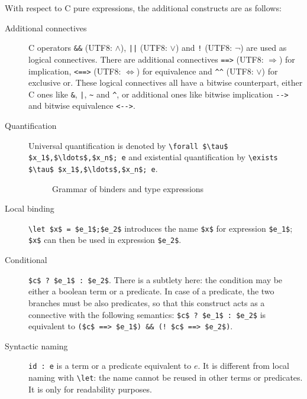 With respect to C pure expressions, the additional constructs are as follows:
\begin{description}
\item[Additional connectives] C operators \lstinline|&&| (UTF8:
  $\land$), \lstinline+||+ (UTF8: $\lor$) and \lstinline|!| (UTF8:
  $\neg$) are used as logical connectives. There are additional
  connectives \lstinline|==>| (UTF8: $\Longrightarrow$) for
  implication, \lstinline|<==>| (UTF8: $\Longleftrightarrow$) for
  equivalence and \lstinline|^^| (UTF8: \underline{\ensuremath{\lor}})
  for exclusive
  or. These logical connectives all have a bitwise counterpart, either
  C ones like \lstinline|&|, \lstinline+|+, \lstinline|~| and
  \lstinline|^|, or additional ones like bitwise implication
  \lstinline|-->| and bitwise equivalence \lstinline|<-->|.

\item[Quantification] Universal quantification is denoted by
  \lstinline|\forall $\tau$ $x_1$,$\ldots$,$x_n$; e| and existential
  quantification by \lstinline|\exists $\tau$ $x_1$,$\ldots$,$x_n$; e|.

\begin{figure}[htp]
  \begin{cadre} 
    \end{cadre}
  \caption{Grammar of binders and type expressions}
\label{fig:gram:binders}
\end{figure}

\item[Local binding]
    \lstinline|\let $x$ = $e_1$;$e_2$|
    introduces the name \lstinline|$x$| for
    expression \lstinline|$e_1$|; \lstinline|$x$| can then be used in expression
    \lstinline|$e_2$|.

\item[Conditional] \lstinline|$c$ ? $e_1$ : $e_2$|. There is a subtlety
  here: the condition may be either a boolean term or a predicate.  In
  case of a predicate, the two branches must be also predicates, so
  that this construct acts as a connective with the following
  semantics: \lstinline|$c$ ? $e_1$ : $e_2$| is equivalent to
  \lstinline|($c$ ==> $e_1$) && (! $c$ ==> $e_2$)|.

\item[Syntactic naming] \lstinline|id : e| is a term or a predicate
  equivalent to $e$. It is different from local naming with \lstinline|\let|:
  the name cannot be reused in other terms or predicates. It is only
  for readability purposes.


\end{description}
